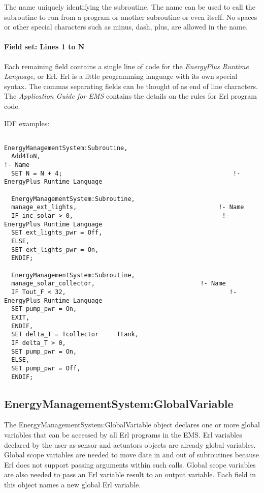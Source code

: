 The name uniquely identifying the subroutine. The name can be used to call the subroutine to run from a program or another subroutine or even itself. No spaces or other special characters such as minus, dash, plus, are allowed in the name.

\paragraph{Field set: Lines 1 to N}\label{field-set-lines-1-to-n}

Each remaining field contains a single line of code for the \emph{EnergyPlus Runtime Language}, or Erl. Erl is a little programming language with its own special syntax. The commas separating fields can be thought of as end of line characters. The \emph{Application Guide for EMS} contains the details on the rules for Erl program code.

IDF examples:

\begin{lstlisting}

EnergyManagementSystem:Subroutine,
  Add4ToN,                                                           !- Name
  SET N = N + 4;                                               !- EnergyPlus Runtime Language

  EnergyManagementSystem:Subroutine,
  manage_ext_lights,                                       !- Name
  IF inc_solar > 0,                                         !- EnergyPlus Runtime Language
  SET ext_lights_pwr = Off,
  ELSE,
  SET ext_lights_pwr = On,
  ENDIF;

  EnergyManagementSystem:Subroutine,
  manage_solar_collector,                             !- Name
  IF Tout_F < 32,                                             !- EnergyPlus Runtime Language
  SET pump_pwr = On,
  EXIT,
  ENDIF,
  SET delta_T = Tcollector     Ttank,
  IF delta_T > 0,
  SET pump_pwr = On,
  ELSE,
  SET pump_pwr = Off,
  ENDIF;
\end{lstlisting}

\subsection{EnergyManagementSystem:GlobalVariable}\label{energymanagementsystemglobalvariable}

The EnergyManagementSystem:GlobalVariable object declares one or more global variables that can be accessed by all Erl programs in the EMS. Erl variables declared by the user as sensor and actuators objects are already global variables. Global scope variables are needed to move date in and out of subroutines because Erl does not support passing arguments within such calls. Global scope variables are also needed to pass an Erl variable result to an output variable. Each field in this object names a new global Erl variable.

